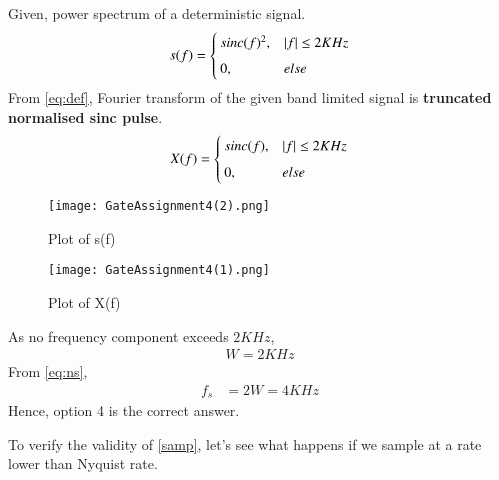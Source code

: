 \documentclass[journal,12pt,twocolumn]{IEEEtran}
\begin{document}
Given, power spectrum of a deterministic signal. 
\begin{align}
    s(f)=\begin{cases}
	sinc(f)^2, & \vert f\vert\leq 2 KHz\\~\\[-1em]
	0, & else
	\end{cases}
	\label{eq:sf}
\end{align}
From \eqref{eq:def}, Fourier transform of the given band limited signal is \textbf{truncated normalised sinc pulse}.
\begin{align}
    X(f)=\begin{cases}
	sinc(f), & \vert f\vert\leq 2 KHz\\~\\[-1em]
	0, & else
	\end{cases}
	\label{eq:Xf}
\end{align}
 \begin{figure}[!h]
 \texttt{[image: GateAssignment4(2).png]}
 \caption{Plot of s(f)}
 \label{plot}
\end{figure}
\begin{figure}[!h]
 \centering
 \texttt{[image: GateAssignment4(1).png]}
 \caption{Plot of X(f)}
 \label{plot}
 \end{figure}
 
 
As no frequency component exceeds $2 KHz$,
\begin{align}
    W=2 KHz
\end{align}
From \eqref{eq:ns}, 
\begin{align}
    f_s&=2W=4 KHz
\end{align}
Hence, option 4 is the correct answer.


To verify the validity of \eqref{samp}, let's see what happens if we sample at a rate lower than Nyquist rate.
\end{document}
